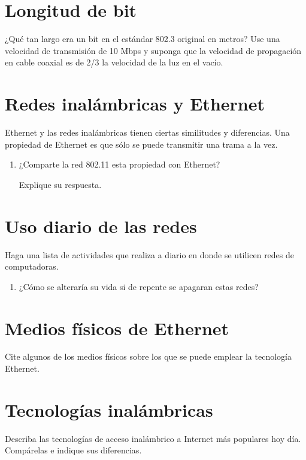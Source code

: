 \documentclass[12pt]{report}
\begin{document}
\section{Longitud de bit \sthree}
¿Qué tan largo era un bit en el estándar 802.3 original en metros? Use una velocidad de transmisión de 10 Mbps y suponga que la velocidad de propagación en cable coaxial es de 2/3 la velocidad de la luz en el vacío.


\section{Redes inalámbricas y Ethernet \sone \steo}
Ethernet y las redes inalámbricas tienen ciertas similitudes y diferencias. Una propiedad de Ethernet es que sólo se puede transmitir una trama a la vez.
\begin{enumerate}
\item ¿Comparte la red 802.11 esta propiedad con Ethernet?

Explique su respuesta.
\end{enumerate}

\section{Uso diario de las redes \sone \steo}
Haga una lista de actividades que realiza a diario en donde se utilicen redes de computadoras. 
\begin{enumerate}
\item ¿Cómo se alteraría su vida si de repente se apagaran estas redes?
\end{enumerate}

\section{Medios físicos de Ethernet \sone \steo}
Cite algunos de los medios físicos sobre los que se puede emplear la tecnología Ethernet.

\section{Tecnologías inalámbricas \sone \steo}
Describa las tecnologías de acceso inalámbrico a Internet más populares hoy día. Compárelas e indique sus diferencias.
\end{document}
